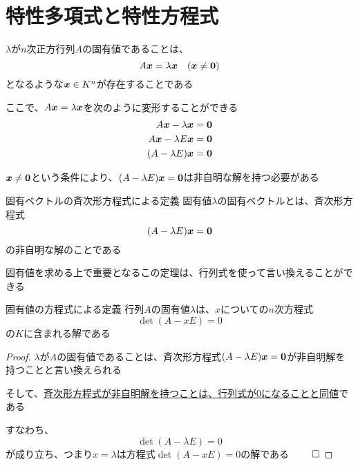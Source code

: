 \documentclass[../../../topic_linear-algebra]{subfiles}
\begin{document}
\sectionline
\section{特性多項式と特性方程式}

$\lambda$が$n$次正方行列$A$の固有値であることは、
\begin{equation*}
  A\vb*{x} = \lambda \vb*{x} \quad (\vb*{x} \neq \vb*{0})
\end{equation*}
となるような$\vb*{x} \in K^n$が存在することである

\br

ここで、$A\vb*{x} = \lambda \vb*{x}$を次のように変形することができる
\begin{align*}
  A\vb*{x} - \lambda \vb*{x}  & = \vb*{0} \\
  A\vb*{x} - \lambda E\vb*{x} & = \vb*{0} \\
  (A - \lambda E)\vb*{x}      & = \vb*{0}
\end{align*}

$\vb*{x} \neq \vb*{0}$という条件により、$(A - \lambda E)\vb*{x} = \vb*{0}$は非自明な解を持つ必要がある

\begin{theorem}{固有ベクトルの斉次形方程式による定義}
  固有値$\lambda$の固有ベクトルとは、斉次形方程式
  \begin{equation*}
    (A - \lambda E)\vb*{x} = \vb*{0}
  \end{equation*}
  の非自明な解のことである
\end{theorem}

固有値を求める上で重要となるこの定理は、行列式を使って言い換えることができる

\begin{theorem}{固有値の方程式による定義}
  行列$A$の固有値$\lambda$は、$x$についての$n$次方程式
  \begin{equation*}
    \det(A - x E) = 0
  \end{equation*}
  の$K$に含まれる解である
\end{theorem}

\begin{proof}
  $\lambda$が$A$の固有値であることは、斉次形方程式$(A - \lambda E)\vb*{x} = \vb*{0}$が非自明解を持つことと言い換えられる

  そして、\hyperref[thm:homogeneous-solution-iff-det-zero]{斉次形方程式が非自明解を持つことは、行列式が0になることと同値}である

  すなわち、
  \begin{equation*}
    \det(A - \lambda E) = 0
  \end{equation*}
  が成り立ち、つまり$x = \lambda$は方程式$\det(A - xE) = 0$の解である $\qed$
\end{proof}
\end{document}
